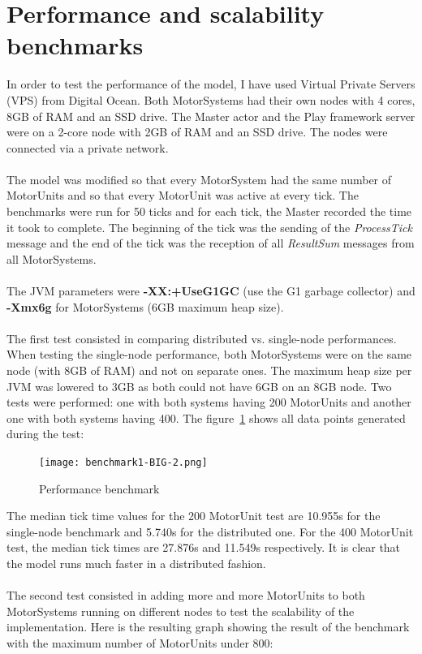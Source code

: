 \documentclass[titlepage]{article}
\begin{document}
\section{Performance and scalability benchmarks}
In order to test the performance of the model, I have used Virtual Private Servers (VPS) from Digital Ocean. Both MotorSystems had their own nodes with 4 cores, 8GB of RAM and an SSD drive. The Master actor and the Play framework server were on a 2-core node with 2GB of RAM and an SSD drive. The nodes were connected via a private network. 
\\\\
The model was modified so that every MotorSystem had the same number of MotorUnits and so that every MotorUnit was active at every tick. The benchmarks were run for 50 ticks and for each tick, the Master recorded the time it took to complete. The beginning of the tick was the sending of the \textit{ProcessTick} message and the end of the tick was the reception of all \textit{ResultSum} messages from all MotorSystems.
\\\\
The JVM parameters were \textbf{-XX:+UseG1GC} (use the G1 garbage collector) and \textbf{-Xmx6g} for MotorSystems (6GB maximum heap size).
\\\\
The first test consisted in comparing distributed vs. single-node performances. When testing the single-node performance, both MotorSystems were on the same node (with 8GB of RAM) and not on separate ones. The maximum heap size per JVM was lowered to 3GB as both could not have 6GB on an 8GB node. Two tests were performed: one with both systems having 200 MotorUnits and another one with both systems having 400. The figure~\ref{fig:benchmark1} shows all data points generated during the test:
\begin{figure}[H]
  \hspace*{-4cm}
  \texttt{[image: benchmark1-BIG-2.png]}
  \caption{Performance benchmark}
  \label{fig:benchmark1}
\end{figure}
The median tick time values for the 200 MotorUnit test are 10.955s for the single-node benchmark and 5.740s for the distributed one. For the 400 MotorUnit test, the median tick times are 27.876s and 11.549s respectively.  It is clear that the model runs much faster in a distributed fashion.
\\\\
The second test consisted in adding more and more MotorUnits to both MotorSystems running on different nodes to test the scalability of the implementation. Here is the resulting graph showing the result of the benchmark with the maximum number of MotorUnits under 800:
\end{document}
